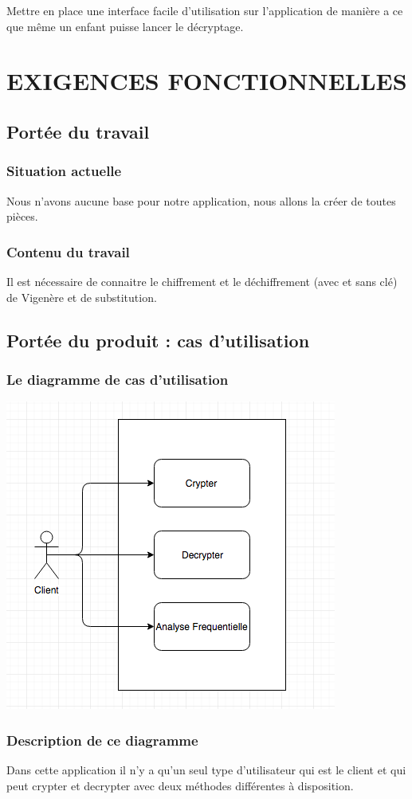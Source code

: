 \documentclass[a4]{article}
\begin{document}
		Mettre en place une interface facile d'utilisation sur l'application de manière a ce que même un enfant puisse lancer le décryptage.
	\section{EXIGENCES FONCTIONNELLES}
		\subsection{Portée du travail}
			\subsubsection{Situation actuelle}
				Nous n'avons aucune base pour notre application, nous allons la créer de toutes pièces.
			\subsubsection{Contenu du travail}
				Il est nécessaire de connaitre le chiffrement et le déchiffrement (avec et sans clé) de Vigenère et de substitution.
		\subsection{Portée du produit : cas d’utilisation}
			\subsubsection {Le diagramme de cas d'utilisation} 
				\includegraphics[scale=0.5]{dia.png} 
			\subsubsection {Description de ce diagramme}
				Dans cette application il n'y a qu'un seul type d'utilisateur qui est le client 
				et qui peut crypter et decrypter avec deux méthodes différentes à disposition.
\end{document}
